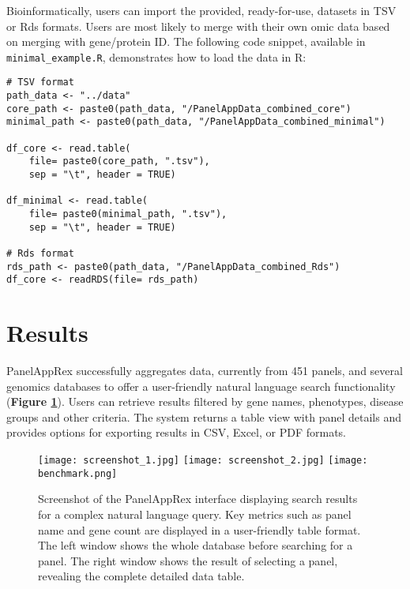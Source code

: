 Bioinformatically, users can import the provided, ready-for-use, datasets in TSV or Rds formats. Users are most likely to merge with their own omic data based on merging with gene/protein ID.
The following code snippet, available in \texttt{minimal\_example.R}, demonstrates how to load the data in R:
\begin{verbatim}
# TSV format
path_data <- "../data"
core_path <- paste0(path_data, "/PanelAppData_combined_core")
minimal_path <- paste0(path_data, "/PanelAppData_combined_minimal")

df_core <- read.table(
    file= paste0(core_path, ".tsv"), 
    sep = "\t", header = TRUE)

df_minimal <- read.table(
    file= paste0(minimal_path, ".tsv"), 
    sep = "\t", header = TRUE)

# Rds format
rds_path <- paste0(path_data, "/PanelAppData_combined_Rds")
df_core <- readRDS(file= rds_path)
\end{verbatim}


\section{Results}
\noindent
PanelAppRex successfully aggregates data, currently from 451 panels, and several genomics databases to offer a user-friendly natural language search functionality (\textbf{Figure \ref{fig:performance}}).
Users can retrieve results filtered by gene names, phenotypes, disease groups and other criteria. The system returns a table view with panel details and provides options for exporting results in CSV, Excel, or PDF formats.

\begin{figure}[ht]
    \centering
    \texttt{[image: screenshot\_1.jpg]}
    \texttt{[image: screenshot\_2.jpg]}    
    \texttt{[image: benchmark.png]}    
    \caption{Screenshot of the PanelAppRex interface displaying search results for a complex natural language query. Key metrics such as panel name and gene count are displayed in a user-friendly table format. The left window shows the whole database before searching for a panel. The right window shows the result of selecting a panel, revealing the complete detailed data table.}
    \label{fig:performance}
\end{figure}

